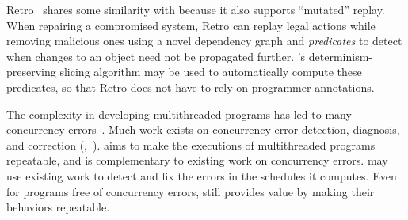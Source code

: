 Retro~\cite{retro:osdi10} shares some similarity with \peregrine because it also
supports ``mutated'' replay.  When repairing a compromised system, Retro
can replay legal actions while removing malicious ones using a novel
dependency graph and \emph{predicates} to detect when changes to an object
need not be propagated further.  \peregrine's determinism-preserving slicing
algorithm may be used to automatically compute these predicates, so that
Retro does not have to rely on programmer annotations. 


 The complexity in developing multithreaded
programs has led to many concurrency errors~\cite{lu:concurrency-bugs}.
Much work exists on concurrency error
detection, diagnosis, and correction 
(\eg,~\cite{yu:racetrack:sosp,racerx:sosp03,lu:muvi:sosp,conmem:asplos10,
conseq:asplos11,2ndstrike:asplos11,linearizable:eurosys11,ctrigger:asplos09}).  
\peregrine aims to make the
executions of multithreaded programs repeatable, and is complementary to
existing work on concurrency errors.  \peregrine may use existing
work to detect and fix the errors in the schedules it computes.
Even for programs free of concurrency errors, \peregrine still provides value by
making their behaviors repeatable.



